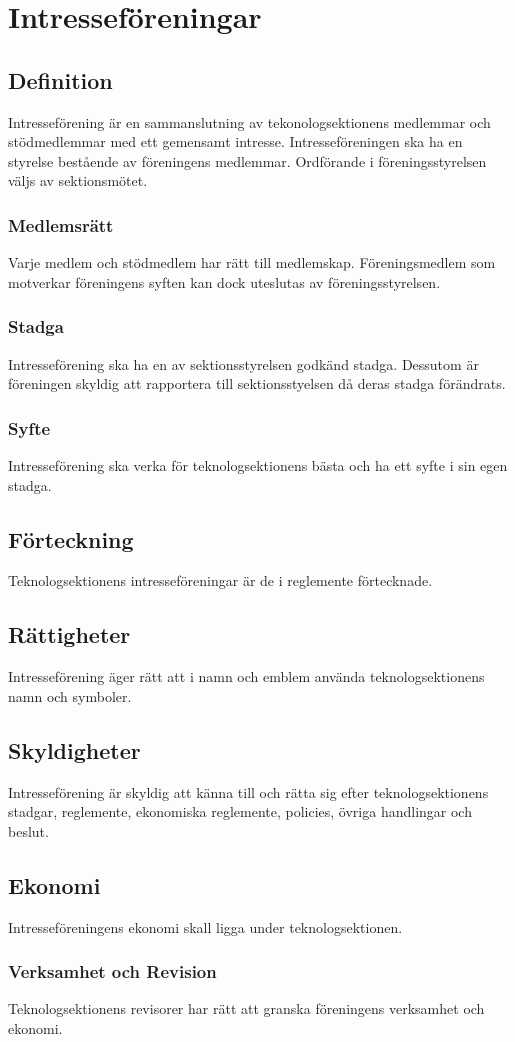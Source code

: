 \section{Intresseföreningar}
\subsection{Definition}
Intresseförening är en sammanslutning av tekonologsektionens medlemmar och stödmedlemmar med ett gemensamt intresse.
Intresseföreningen ska ha en styrelse bestående av föreningens medlemmar.
Ordförande i föreningsstyrelsen väljs av sektionsmötet.
\subsubsection{Medlemsrätt}
Varje medlem och stödmedlem har rätt till medlemskap.
Föreningsmedlem som motverkar föreningens syften kan dock uteslutas av föreningsstyrelsen.
\subsubsection{Stadga}
Intresseförening ska ha en av sektionsstyrelsen godkänd stadga.
Dessutom är föreningen skyldig att rapportera till sektionsstyelsen då deras stadga förändrats.
\subsubsection{Syfte}
Intresseförening ska verka för teknologsektionens bästa och ha ett syfte i sin egen stadga.
\subsection{Förteckning}
Teknologsektionens intresseföreningar är de i reglemente förtecknade.
\subsection{Rättigheter}
Intresseförening äger rätt att i namn och emblem använda teknologsektionens namn och symboler.
\subsection{Skyldigheter}
Intresseförening är skyldig att känna till och rätta sig efter teknologsektionens stadgar, reglemente, ekonomiska reglemente, policies, övriga handlingar och beslut.
\subsection{Ekonomi}
Intresseföreningens ekonomi skall ligga under teknologsektionen.
\subsubsection{Verksamhet och Revision}
Teknologsektionens revisorer har rätt att granska föreningens verksamhet och ekonomi.
